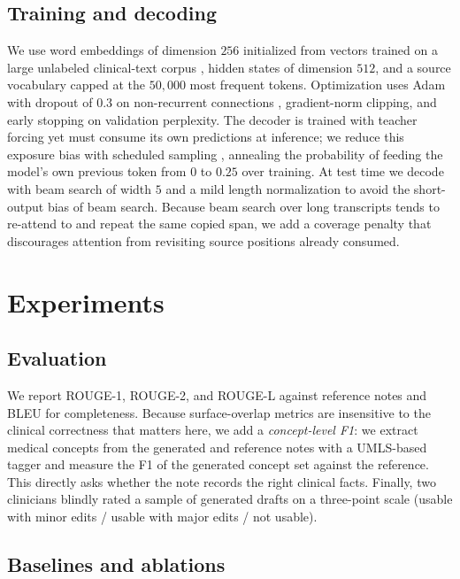 \documentclass{article}
\begin{document}
\subsection{Training and decoding}

We use word embeddings of dimension $256$ initialized from vectors trained on a
large unlabeled clinical-text corpus \citep{Mikolov2013}, hidden states of dimension
$512$, and a source vocabulary capped at the $50{,}000$ most frequent tokens.
Optimization uses Adam \citep{Kingma2015} with dropout of $0.3$ on non-recurrent
connections \citep{Zaremba2014}, gradient-norm clipping, and early stopping on
validation perplexity. The decoder is trained with teacher forcing yet must consume
its own predictions at inference; we reduce this exposure bias with scheduled sampling
\citep{Bengio2015}, annealing the probability of feeding the model's own previous
token from $0$ to $0.25$ over training. At test time we decode with beam search of
width $5$ and a mild length normalization to avoid the short-output bias of beam
search. Because beam search over long transcripts tends to re-attend to and repeat the
same copied span, we add a coverage penalty \citep{Tu2016} that discourages attention
from revisiting source positions already consumed.

\section{Experiments}

\subsection{Evaluation}

We report ROUGE-1, ROUGE-2, and ROUGE-L \citep{Lin2004} against reference notes and
BLEU \citep{Papineni2002} for completeness. Because surface-overlap metrics are
insensitive to the clinical correctness that matters here, we add a
\emph{concept-level F1}: we extract medical concepts from the generated and reference
notes with a UMLS-based tagger \citep{Aronson2010} and measure the F1 of the
generated concept set against the reference. This directly asks whether the note
records the right clinical facts. Finally, two clinicians blindly rated a sample of
generated drafts on a three-point scale (usable with minor edits / usable with major
edits / not usable).

\subsection{Baselines and ablations}
\end{document}
